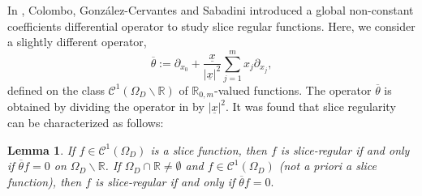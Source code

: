\documentclass{amsart}
\newtheorem{lemma}[theorem]{Lemma}
\theoremstyle{definition}
\newtheorem{definition}[theorem]{Definition}
\newtheorem{proposition}[theorem]{Proposition}
\theoremstyle{remark}
\numberwithin{equation}{section}
\begin{document}

In \cite{cgs}, Colombo, Gonz\'alez-Cervantes and Sabadini introduced a global non-constant coefficients differential operator to study slice regular functions. Here, we consider a slightly different operator,
  \begin{equation*}
     \overline{\theta}:=\partial_{x_0}+\frac{\underline x}{|\underline x|^2}\sum_{j=1}^m x_j\partial_{x_j},
 \end{equation*}
 defined on the class $\mathcal{C}^{1}(\Omega_{D}\backslash\mathbb{R})$ of $\mathbb{R}_{0,m}$-valued functions. The operator $\overline{\theta}$ is obtained by dividing the operator in \cite{cgs}  by $|\underline x|^2$.
 It was found that  slice regularity can be characterized as follows:
\begin{lemma} \cite{gp, per}\label{slice1} %
If $f\in \mathcal{C}^{1}(\Omega_{D})$ is a slice function, then $f$ is slice-regular if and only if $\overline{\theta}f=0$
on $\Omega_{D}\backslash\mathbb{R}$. If $\Omega_{D}\cap \mathbb{R}\neq \emptyset$ and $f\in \mathcal{C}^{1}(\Omega_{D})$ (not a priori a slice function), then $f$ is slice-regular if and only if $\overline{\theta}f=0.$

\end{lemma}
\end{document}
